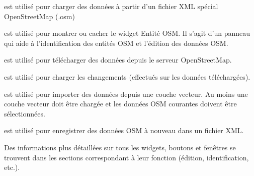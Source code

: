\begin{description}
\item {} est utilisé pour charger des données à partir d'un fichier XML spécial OpenStreetMap (.osm)
\item {} est utilisé pour montrer ou cacher le widget Entité OSM. Il s'agit d'un panneau qui aide à l'identification des entités OSM et l'édition des données OSM.
\item {} est utilisé pour télécharger des données depuis le serveur OpenStreetMap.
\item {} est utilisé pour charger les changements (effectués sur les données téléchargées). 
\item {} est utilisé pour importer des données depuis une couche vecteur. Au moins une couche vecteur doit être chargée et les données OSM courantes doivent être sélectionnées.
\item {} est utilisé pour enregistrer des données OSM à nouveau dans un fichier XML.
\end{description}

Des informations plus détaillées sur tous les widgets, boutons et fenêtres se trouvent dans les sections correspondant à leur fonction (édition, identification, etc.).

